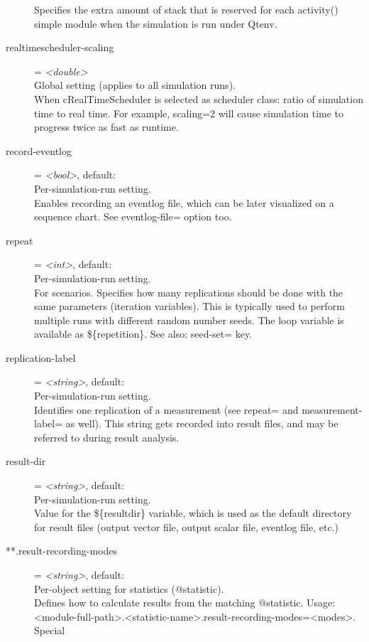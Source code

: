 \begin{description}
    Specifies the extra amount of stack that is reserved for each activity()
    simple module when the simulation is run under Qtenv.
\item[realtimescheduler-scaling] = \textit{<double>}\\
    Global setting (applies to all simulation runs).\\
    When cRealTimeScheduler is selected as scheduler class: ratio of simulation
    time to real time. For example, scaling=2 will cause simulation time to
    progress twice as fast as runtime.
\item[record-eventlog] = \textit{<bool>}, default: \\
    Per-simulation-run setting.\\
    Enables recording an eventlog file, which can be later visualized on a
    sequence chart. See eventlog-file= option too.
\item[repeat] = \textit{<int>}, default: \\
    Per-simulation-run setting.\\
    For scenarios. Specifies how many replications should be done with the same
    parameters (iteration variables). This is typically used to perform
    multiple runs with different random number seeds. The loop variable is
    available as \$\{repetition\}. See also: seed-set= key.
\item[replication-label] = \textit{<string>}, default: \\
    Per-simulation-run setting.\\
    Identifies one replication of a measurement (see repeat= and
    measurement-label= as well). This string gets recorded into result files,
    and may be referred to during result analysis.
\item[result-dir] = \textit{<string>}, default: \\
    Per-simulation-run setting.\\
    Value for the \$\{resultdir\} variable, which is used as the default
    directory for result files (output vector file, output scalar file,
    eventlog file, etc.)
\item[**.result-recording-modes] = \textit{<string>}, default: \\
    Per-object setting for statistics (@statistic).\\
    Defines how to calculate results from the matching @statistic. Usage:
    <module-full-path>.<statistic-name>.result-recording-modes=<modes>. Special

\end{description}
